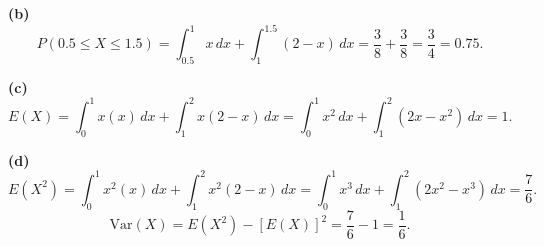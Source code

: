 \documentclass[12pt,a4paper]{exam}
\begin{document}
\begin{questions}
\begin{solution}
\textbf{(b)} \[
P(0.5\le X\le 1.5)=\int_{0.5}^{1}x\,dx+\int_{1}^{1.5}(2-x)\,dx
=\frac{3}{8}+\frac{3}{8}=\frac{3}{4}=0.75.
\]

\textbf{(c)} \[
E(X)=\int_0^1 x(x)\,dx+\int_1^2 x(2-x)\,dx
=\int_0^1 x^2\,dx+\int_1^2 (2x-x^2)\,dx=1.
\]

\textbf{(d)} \[
E(X^2)=\int_0^1 x^2(x)\,dx+\int_1^2 x^2(2-x)\,dx
=\int_0^1 x^3\,dx+\int_1^2 (2x^2-x^3)\,dx=\frac{7}{6}.
\]
\[
\mathrm{Var}(X)=E(X^2)-[E(X)]^2=\frac{7}{6}-1=\frac{1}{6}.
\]
\endgroup
\end{solution}

\vfill

\end{questions}
\end{document}
